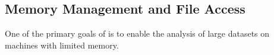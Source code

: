 \subsection{Memory Management and File Access}
\label{sec:fileIO}
One of the primary goals of  is to enable the analysis of large datasets on machines with limited memory.